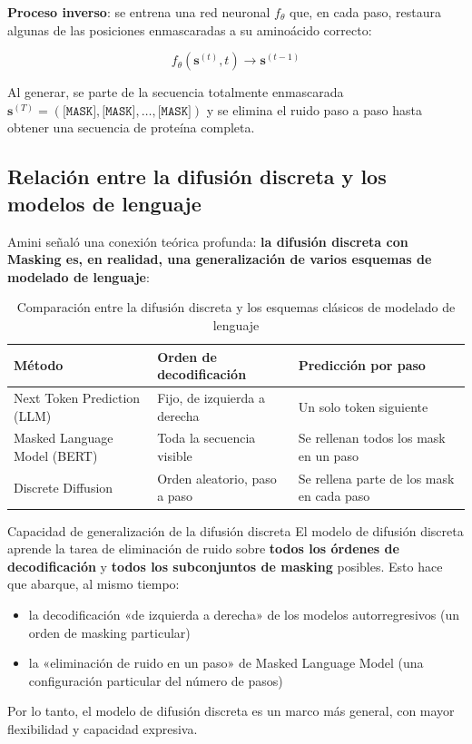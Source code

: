 \documentclass[a4paper]{article}
\begin{document}
\textbf{Proceso inverso}: se entrena una red neuronal $f_\theta$ que, en cada paso, restaura algunas de las posiciones enmascaradas a su aminoácido correcto:

$$f_\theta(\mathbf{s}^{(t)}, t) \rightarrow \mathbf{s}^{(t-1)}$$

Al generar, se parte de la secuencia totalmente enmascarada $\mathbf{s}^{(T)} = (\texttt{[MASK]}, \texttt{[MASK]}, \ldots, \texttt{[MASK]})$ y se elimina el ruido paso a paso hasta obtener una secuencia de proteína completa.

\subsection{Relación entre la difusión discreta y los modelos de lenguaje}

Amini señaló una conexión teórica profunda: \textbf{la difusión discreta con Masking es, en realidad, una generalización de varios esquemas de modelado de lenguaje}:

\begin{table}[H]
\centering
\caption{Comparación entre la difusión discreta y los esquemas clásicos de modelado de lenguaje}
\begin{tabular}{@{}lll@{}}
\toprule
\textbf{Método} & \textbf{Orden de decodificación} & \textbf{Predicción por paso} \\
\midrule
Next Token Prediction (LLM) & Fijo, de izquierda a derecha & Un solo token siguiente \\
Masked Language Model (BERT) & Toda la secuencia visible & Se rellenan todos los mask en un paso \\
Discrete Diffusion & Orden aleatorio, paso a paso & Se rellena parte de los mask en cada paso \\
\bottomrule
\end{tabular}
\end{table}

\begin{importantbox}{Capacidad de generalización de la difusión discreta}
El modelo de difusión discreta aprende la tarea de eliminación de ruido sobre \textbf{todos los órdenes de decodificación} y \textbf{todos los subconjuntos de masking} posibles. Esto hace que abarque, al mismo tiempo:
\begin{itemize}
    \item la decodificación «de izquierda a derecha» de los modelos autorregresivos (un orden de masking particular)
    \item la «eliminación de ruido en un paso» de Masked Language Model (una configuración particular del número de pasos)
\end{itemize}
Por lo tanto, el modelo de difusión discreta es un marco más general, con mayor flexibilidad y capacidad expresiva.
\end{importantbox}
\end{document}
